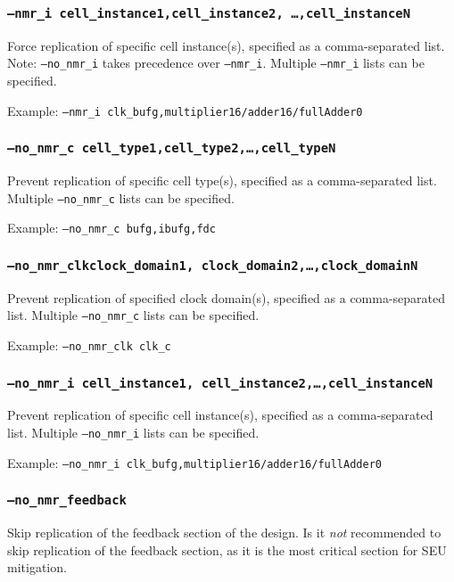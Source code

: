 \subsubsection{\texttt{--nmr\_i cell\_instance1,cell\_instance2,
\ldots,cell\_instanceN}}
Force replication of specific cell instance(s), specified as a comma-separated
list. 
Note: \texttt{--no\_nmr\_i} takes precedence over \texttt{--nmr\_i}. Multiple
\texttt{--nmr\_i} lists can be specified.
 
Example: \texttt{--nmr\_i clk\_bufg,multiplier16/adder16/fullAdder0}

\subsubsection{\texttt{--no\_nmr\_c cell\_type1,cell\_type2,\ldots,cell\_typeN}}
Prevent replication of specific cell type(s), specified as a comma-separated 
list. Multiple \texttt{--no\_nmr\_c} lists can be specified.

Example: \texttt{--no\_nmr\_c bufg,ibufg,fdc}

\subsubsection{\texttt{--no\_nmr\_clkclock\_domain1,
clock\_domain2,\ldots,clock\_domainN}}
Prevent replication of specified clock domain(s), specified as a comma-separated 
list. Multiple \texttt{--no\_nmr\_c} lists can be specified.

Example: \texttt{--no\_nmr\_clk clk\_c}


\subsubsection{\texttt{--no\_nmr\_i cell\_instance1,
cell\_instance2,\ldots,cell\_instanceN}}
Prevent replication of specific cell instance(s), specified as a 
comma-separated list. Multiple \texttt{--no\_nmr\_i} lists can be
specified.

Example: \texttt{--no\_nmr\_i clk\_bufg,multiplier16/adder16/fullAdder0}

\subsubsection{\texttt{--no\_nmr\_feedback}}
Skip replication of the feedback section of the design. 
Is it \emph{not} recommended to skip replication of the feedback section, as 
it is the most critical section for SEU mitigation.

